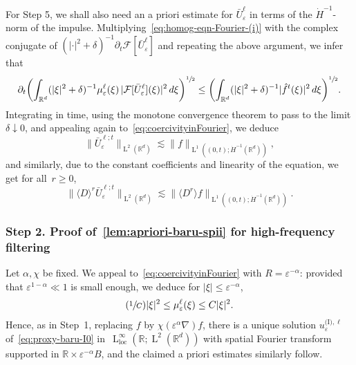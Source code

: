 \documentclass[JEP,XML,SOM,Unicode,published]{cedram}
\newcommand{\Psfrac}[2]{(\sfrac{#1}{#2})}
\theoremstyle{plain}
\theoremstyle{definition}
\numberwithin{equation}{section}
\newcommand{\e}{\varepsilon}
\newcommand{\R}{\mathbb R}
\newcommand{\F}{\mathcal F}
\newcommand{\loc}{{\operatorname{loc}}}
\newcommand{\Ld}{\operatorname{L}}
\newcommand{\step}[1]{\subsubsection*{Step \textup #1}}
\begin{document}
For Step 5, we shall also need an a priori estimate for $\bar U_\e^\ell$ in terms of the \mbox{$\dot{H}^{-1}$-norm} of the impulse. Multiplying~\eqref{eq:homog-eqn-Fourier-(i)} with the complex conjugate of $(|\cdot|^2+\delta)^{-1}\partial_t\F[\bar U_\e^\ell]$ and repeating the above argument, we infer that
\begin{equation*}
\partial_t\biggl(\int_{\R^d}(|\xi|^2+\delta)^{-1}\mu_{\e}^{\ell}(\xi)\,|\F[\bar U_\e^\ell](\xi)|^2\,d\xi\biggr)^{\sfrac{1}{2}}\le \biggl(\int_{\R^d}(|\xi|^2+\delta)^{-1}|\hat{f}^t(\xi)|^2\,d\xi\biggr)^{\sfrac{1}{2}}.
\end{equation*}
{Integrating in time, using the monotone convergence theorem to pass to the limit $\delta\downarrow0$, and appealing again to~\eqref{eq:coercivityinFourier}, we deduce
\begin{equation*}
\|\bar U_\e^{\ell;t}\|_{\Ld^2(\R^d)}\lesssim\|f\|_{\Ld^1((0,t);\dot{H}^{-1}(\R^d))},
\end{equation*}
and} similarly, due to the constant coefficients and linearity of the equation, we get for all~$r\geq 0$,
\begin{equation}\label{eq:negativeNorm}
\|\langle D\rangle^r\bar U_\e^{\ell;t}\|_{\Ld^2(\R^d)}\lesssim \|\langle D^r\rangle f\|_{\Ld^1((0,t);\dot{H}^{-1}(\R^d))}.
\end{equation}

\step{2. Proof of~\eqref{lem:apriori-baru-spii} for high-frequency filtering}
Let $\alpha,\chi$ be fixed. We appeal to~\eqref{eq:coercivityinFourier} with $R=\e^{-\alpha}$: provided that $\e^{1-\alpha}\ll1$ is small enough, we deduce for $|\xi|\le\e^{-\alpha}$,
\begin{equation}\label{eq:coercivitybyfiltering}
\Psfrac{1}{C}|\xi|^2\leq\mu^{\ell}_{\e}(\xi)\leq C|\xi|^2.
\end{equation}
Hence, as in Step~1, replacing $f$ by $\chi(\e^{\alpha}\nabla)f$, there is a unique solution $u_{\e}^{\text{(I)},\ell}$ of~\eqref{eq:proxy-baru-I0} in~$\Ld^\infty_\loc(\R;\Ld^2(\R^d))$ with spatial Fourier transform supported in $\R\times\e^{-\alpha}B$, and the claimed a priori estimates similarly follow.
\end{document}
